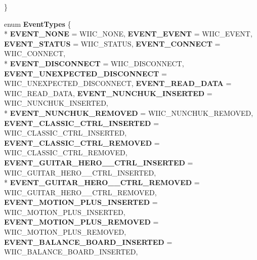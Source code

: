 \begin{DoxyCompactItemize}
 \}
\item 
enum {\bfseries Event\-Types} \{ \\*
{\bfseries E\-V\-E\-N\-T\-\_\-\-N\-O\-N\-E} =  W\-I\-I\-C\-\_\-\-N\-O\-N\-E, 
{\bfseries E\-V\-E\-N\-T\-\_\-\-E\-V\-E\-N\-T} =  W\-I\-I\-C\-\_\-\-E\-V\-E\-N\-T, 
{\bfseries E\-V\-E\-N\-T\-\_\-\-S\-T\-A\-T\-U\-S} =  W\-I\-I\-C\-\_\-\-S\-T\-A\-T\-U\-S, 
{\bfseries E\-V\-E\-N\-T\-\_\-\-C\-O\-N\-N\-E\-C\-T} =  W\-I\-I\-C\-\_\-\-C\-O\-N\-N\-E\-C\-T, 
\\*
{\bfseries E\-V\-E\-N\-T\-\_\-\-D\-I\-S\-C\-O\-N\-N\-E\-C\-T} =  W\-I\-I\-C\-\_\-\-D\-I\-S\-C\-O\-N\-N\-E\-C\-T, 
{\bfseries E\-V\-E\-N\-T\-\_\-\-U\-N\-E\-X\-P\-E\-C\-T\-E\-D\-\_\-\-D\-I\-S\-C\-O\-N\-N\-E\-C\-T} =  W\-I\-I\-C\-\_\-\-U\-N\-E\-X\-P\-E\-C\-T\-E\-D\-\_\-\-D\-I\-S\-C\-O\-N\-N\-E\-C\-T, 
{\bfseries E\-V\-E\-N\-T\-\_\-\-R\-E\-A\-D\-\_\-\-D\-A\-T\-A} =  W\-I\-I\-C\-\_\-\-R\-E\-A\-D\-\_\-\-D\-A\-T\-A, 
{\bfseries E\-V\-E\-N\-T\-\_\-\-N\-U\-N\-C\-H\-U\-K\-\_\-\-I\-N\-S\-E\-R\-T\-E\-D} =  W\-I\-I\-C\-\_\-\-N\-U\-N\-C\-H\-U\-K\-\_\-\-I\-N\-S\-E\-R\-T\-E\-D, 
\\*
{\bfseries E\-V\-E\-N\-T\-\_\-\-N\-U\-N\-C\-H\-U\-K\-\_\-\-R\-E\-M\-O\-V\-E\-D} =  W\-I\-I\-C\-\_\-\-N\-U\-N\-C\-H\-U\-K\-\_\-\-R\-E\-M\-O\-V\-E\-D, 
{\bfseries E\-V\-E\-N\-T\-\_\-\-C\-L\-A\-S\-S\-I\-C\-\_\-\-C\-T\-R\-L\-\_\-\-I\-N\-S\-E\-R\-T\-E\-D} =  W\-I\-I\-C\-\_\-\-C\-L\-A\-S\-S\-I\-C\-\_\-\-C\-T\-R\-L\-\_\-\-I\-N\-S\-E\-R\-T\-E\-D, 
{\bfseries E\-V\-E\-N\-T\-\_\-\-C\-L\-A\-S\-S\-I\-C\-\_\-\-C\-T\-R\-L\-\_\-\-R\-E\-M\-O\-V\-E\-D} =  W\-I\-I\-C\-\_\-\-C\-L\-A\-S\-S\-I\-C\-\_\-\-C\-T\-R\-L\-\_\-\-R\-E\-M\-O\-V\-E\-D, 
{\bfseries E\-V\-E\-N\-T\-\_\-\-G\-U\-I\-T\-A\-R\-\_\-\-H\-E\-R\-O\-\_\-\_\-\-C\-T\-R\-L\-\_\-\-I\-N\-S\-E\-R\-T\-E\-D} =  W\-I\-I\-C\-\_\-\-G\-U\-I\-T\-A\-R\-\_\-\-H\-E\-R\-O\-\_\-\_\-\-C\-T\-R\-L\-\_\-\-I\-N\-S\-E\-R\-T\-E\-D, 
\\*
{\bfseries E\-V\-E\-N\-T\-\_\-\-G\-U\-I\-T\-A\-R\-\_\-\-H\-E\-R\-O\-\_\-\_\-\-C\-T\-R\-L\-\_\-\-R\-E\-M\-O\-V\-E\-D} =  W\-I\-I\-C\-\_\-\-G\-U\-I\-T\-A\-R\-\_\-\-H\-E\-R\-O\-\_\-\_\-\-C\-T\-R\-L\-\_\-\-R\-E\-M\-O\-V\-E\-D, 
{\bfseries E\-V\-E\-N\-T\-\_\-\-M\-O\-T\-I\-O\-N\-\_\-\-P\-L\-U\-S\-\_\-\-I\-N\-S\-E\-R\-T\-E\-D} =  W\-I\-I\-C\-\_\-\-M\-O\-T\-I\-O\-N\-\_\-\-P\-L\-U\-S\-\_\-\-I\-N\-S\-E\-R\-T\-E\-D, 
{\bfseries E\-V\-E\-N\-T\-\_\-\-M\-O\-T\-I\-O\-N\-\_\-\-P\-L\-U\-S\-\_\-\-R\-E\-M\-O\-V\-E\-D} =  W\-I\-I\-C\-\_\-\-M\-O\-T\-I\-O\-N\-\_\-\-P\-L\-U\-S\-\_\-\-R\-E\-M\-O\-V\-E\-D, 
{\bfseries E\-V\-E\-N\-T\-\_\-\-B\-A\-L\-A\-N\-C\-E\-\_\-\-B\-O\-A\-R\-D\-\_\-\-I\-N\-S\-E\-R\-T\-E\-D} =  W\-I\-I\-C\-\_\-\-B\-A\-L\-A\-N\-C\-E\-\_\-\-B\-O\-A\-R\-D\-\_\-\-I\-N\-S\-E\-R\-T\-E\-D, 

\end{DoxyCompactItemize}
